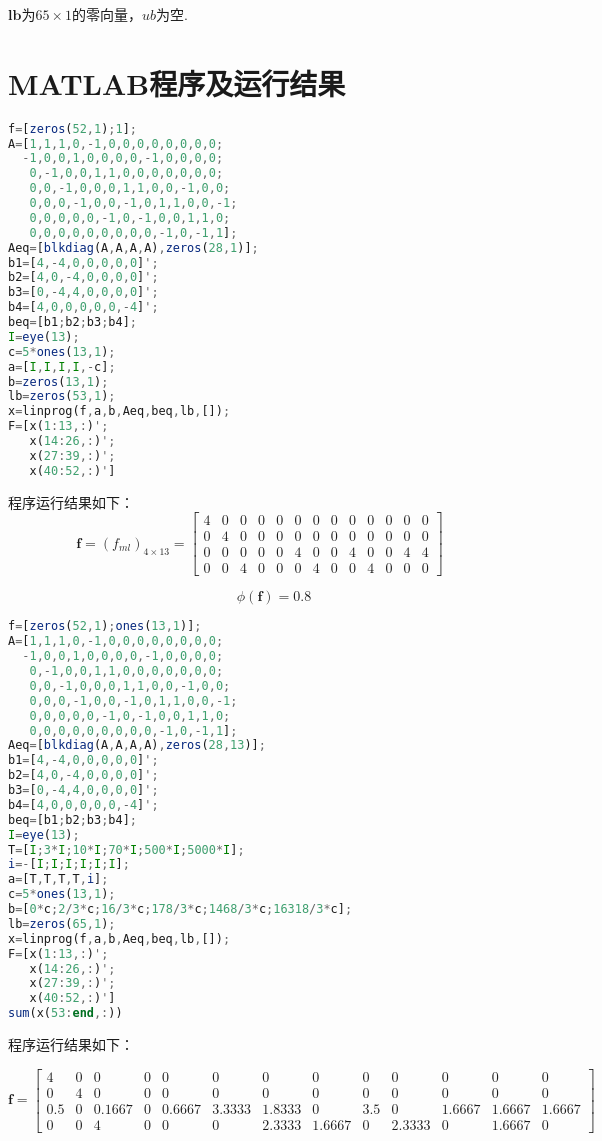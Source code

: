 \documentclass[UTF8]{ctexart}
\begin{document}
$\bm{lb}$为$65\times 1$的零向量，$ub$为空.

\newpage
\section{MATLAB程序及运行结果}
\begin{lstlisting}[language=Octave]
%MAU
f=[zeros(52,1);1];
A=[1,1,1,0,-1,0,0,0,0,0,0,0,0;
  -1,0,0,1,0,0,0,0,-1,0,0,0,0;
   0,-1,0,0,1,1,0,0,0,0,0,0,0;
   0,0,-1,0,0,0,1,1,0,0,-1,0,0;
   0,0,0,-1,0,0,-1,0,1,1,0,0,-1;
   0,0,0,0,0,-1,0,-1,0,0,1,1,0;
   0,0,0,0,0,0,0,0,0,-1,0,-1,1];
Aeq=[blkdiag(A,A,A,A),zeros(28,1)];
b1=[4,-4,0,0,0,0,0]';
b2=[4,0,-4,0,0,0,0]';
b3=[0,-4,4,0,0,0,0]';
b4=[4,0,0,0,0,0,-4]';
beq=[b1;b2;b3;b4];
I=eye(13);
c=5*ones(13,1);
a=[I,I,I,I,-c];
b=zeros(13,1);
lb=zeros(53,1);
x=linprog(f,a,b,Aeq,beq,lb,[]);
F=[x(1:13,:)';
   x(14:26,:)';
   x(27:39,:)';
   x(40:52,:)']
\end{lstlisting}

程序运行结果如下：
\[\bm{f}= (f_{ml})_{4\times 13}=\left[ {\begin{array}{*{20}{c}}
4&0&0&0&0&0&0&0&0&0&0&0&0\\
0&4&0&0&0&0&0&0&0&0&0&0&0\\
0&0&0&0&0&4&0&0&4&0&0&4&4\\
0&0&4&0&0&0&4&0&0&4&0&0&0
\end{array}} \right]\]

\[\qquad \phi(\bm{f})=0.8\]


\newpage
\begin{lstlisting}[language=Octave]
%M/M/1
f=[zeros(52,1);ones(13,1)];
A=[1,1,1,0,-1,0,0,0,0,0,0,0,0;
  -1,0,0,1,0,0,0,0,-1,0,0,0,0;
   0,-1,0,0,1,1,0,0,0,0,0,0,0;
   0,0,-1,0,0,0,1,1,0,0,-1,0,0;
   0,0,0,-1,0,0,-1,0,1,1,0,0,-1;
   0,0,0,0,0,-1,0,-1,0,0,1,1,0;
   0,0,0,0,0,0,0,0,0,-1,0,-1,1];
Aeq=[blkdiag(A,A,A,A),zeros(28,13)];
b1=[4,-4,0,0,0,0,0]';
b2=[4,0,-4,0,0,0,0]';
b3=[0,-4,4,0,0,0,0]';
b4=[4,0,0,0,0,0,-4]';
beq=[b1;b2;b3;b4];
I=eye(13);
T=[I;3*I;10*I;70*I;500*I;5000*I];
i=-[I;I;I;I;I;I];
a=[T,T,T,T,i];
c=5*ones(13,1);
b=[0*c;2/3*c;16/3*c;178/3*c;1468/3*c;16318/3*c];
lb=zeros(65,1);
x=linprog(f,a,b,Aeq,beq,lb,[]);
F=[x(1:13,:)';
   x(14:26,:)';
   x(27:39,:)';
   x(40:52,:)']
sum(x(53:end,:))
\end{lstlisting}
程序运行结果如下：

\[\bm{f}=\left[ {\begin{array}{*{20}{c}}
4&0&0&0&0&0&0&0&0&0&0&0&0\\
0&4&0&0&0&0&0&0&0&0&0&0&0\\
0.5&0&0.1667&0&0.6667&3.3333&1.8333&0&3.5&0&1.6667&1.6667&1.6667\\
0&0&4&0&0&0&2.3333&1.6667&0&2.3333&0&1.6667&0
\end{array}} \right]\]
\end{document}
